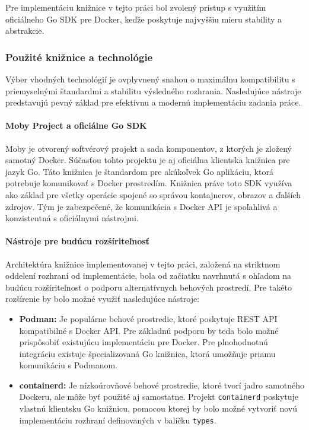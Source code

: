 \documentclass[
 program=infpvs,
  language=slovak,
  figures=false,
  tables=false,
  sourcecodes,
  glossaries,
  index
]{kidiplom}
\begin{document}
{Pre implementáciu knižnice v tejto práci bol zvolený prístup s využitím oficiálneho Go SDK pre Docker, keďže poskytuje najvyššiu mieru stability a abstrakcie.



\subsubsection{Použité knižnice a technológie}  \label{sec:pouzite-technologie}
Výber vhodných technológií je ovplyvnený snahou o maximálnu kompatibilitu s priemyselnými štandardmi a stabilitu výsledného rozhrania. Nasledujúce nástroje predstavujú pevný základ pre efektívnu a modernú implementáciu zadania práce.



\paragraph{Moby Project a oficiálne Go SDK}  \label{par:moby-sdk}
Moby je otvorený softvérový projekt a sada komponentov, z ktorých je zložený samotný Docker. Súčasťou tohto projektu je aj oficiálna klientska knižnica pre jazyk Go. Táto knižnica je štandardom pre akúkoľvek Go aplikáciu, ktorá potrebuje komunikovať s Docker prostredím. Knižnica práve toto SDK využíva ako základ pre všetky operácie spojené so správou kontajnerov, obrazov a ďalších zdrojov. Tým je zabezpečené, že komunikácia s Docker API je spoľahlivá a konzistentná s oficiálnymi nástrojmi.



\paragraph{Nástroje pre budúcu rozšíriteľnosť}  \label{sec:buduce-nastroje}
Architektúra knižnice implementovanej v tejto práci, založená na striktnom oddelení rozhraní od implementácie, bola od začiatku navrhnutá s ohľadom na budúcu rozšíriteľnosť o podporu alternatívnych behových prostredí. Pre takéto rozšírenie by bolo možné využiť nasledujúce nástroje:
\begin{itemize}
    \item \textbf{Podman:} Je populárne behové prostredie, ktoré poskytuje REST API kompatibilné s Docker API. Pre základnú podporu by teda bolo možné prispôsobiť existujúcu implementáciu pre Docker. Pre plnohodnotnú integráciu existuje špecializovaná Go knižnica, ktorá umožňuje priamu komunikáciu s Podmanom.
    \item \textbf{containerd:} Je nízkoúrovňové behové prostredie, ktoré tvorí jadro samotného Dockeru, ale môže byť použité aj samostatne. Projekt \texttt{containerd} poskytuje vlastnú klientsku Go knižnicu, pomocou ktorej by bolo možné vytvoriť novú implementáciu rozhraní definovaných v balíčku \texttt{types}.
 \end{itemize}



}
\end{document}
